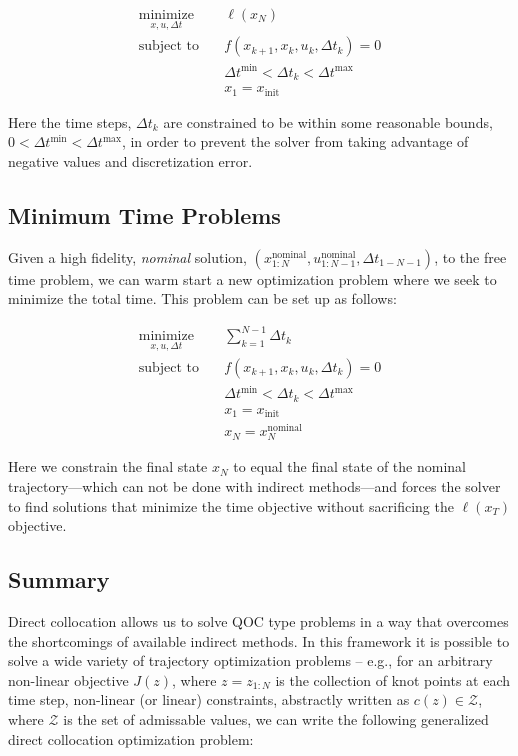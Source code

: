 \documentclass{article}
\newcommand{\minimize}[1]{\underset{#1}{\text{minimize}}}
\newcommand{\st}{\text{subject to}}
\begin{document}
\begin{align}
  \minimize{x, u, \Delta t} \quad & \ell(x_N) \\
  \st \quad & f(x_{k+1}, x_k, u_k, \Delta t_k) = 0 \\
            & \Delta t^{\min} < \Delta t_k < \Delta t^{\max} \\
            & x_1 = x_{\text{init}} 
\end{align}

Here the time steps, $\Delta t_k$ are constrained to be within some reasonable bounds, $0 < \Delta t^{\min} < \Delta t^{\max}$, in order to prevent the solver from taking advantage of negative values and discretization error.   

\subsection{Minimum Time Problems}

Given a high fidelity, \textit{nominal} solution, $(x_{1:N}^{\text{nominal}}, u_{1:N-1}^{\text{nominal}}, \Delta t_{{1-N-1}})$, to the free time problem, we can warm start a new optimization problem where we seek to minimize the total time.  This problem can be set up as follows:

\begin{align}
  \minimize{x, u, \Delta t} \quad & \sum_{k=1}^{N-1} \Delta t_k \\
  \st \quad & f(x_{k+1}, x_k, u_k, \Delta t_k) = 0 \\
            & \Delta t^{\min} < \Delta t_k < \Delta t^{\max} \\
            & x_1 = x_{\text{init}} \\
            & x_N = x_N^{\text{nominal}}
\end{align}

Here we constrain the final state $x_N$ to equal the final state of the nominal trajectory---which can not be done with indirect methods---and forces the solver to find solutions that minimize the time objective without sacrificing the $\ell(x_T)$ objective.

\subsection{Summary}
Direct collocation allows us to solve QOC type problems in a way that overcomes the shortcomings of available indirect methods.  In this framework it is possible to solve a wide variety of trajectory optimization problems -- e.g., for an arbitrary non-linear objective $J(z)$, where $z = z_{1:N}$ is the collection of knot points at each time step, non-linear (or linear) constraints, abstractly written as $c(z) \in \mathcal{Z}$, where $\mathcal{Z}$ is the set of admissable values, we can write the following generalized direct collocation optimization problem:
\end{document}

